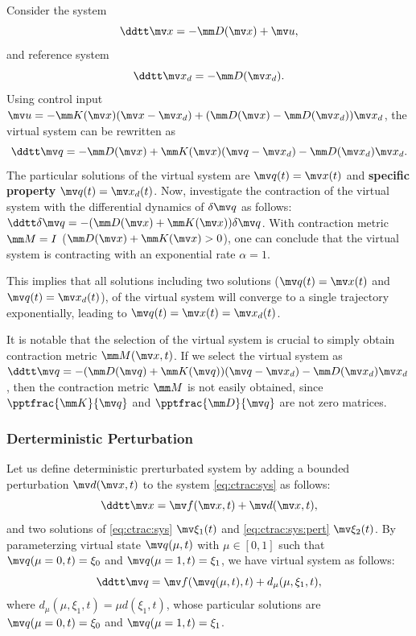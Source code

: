 \begin{example}
    Consider the system 
    \begin{equation}
        \ddtt \bdx = -\mm D(\bdx) + \bdu,
    \end{equation}
    and reference system 
    \begin{equation}
        \ddtt \bdx_d = -\mm D(\bdx_d).
    \end{equation}
    Using control input $\bdu = -\mm K(\bdx)(\bdx-\bdx_d)+(\mm D(\bdx)-\mm D(\bdx_d))\bdx_d$, the virtual system can be rewritten as
    \begin{equation}
        \ddtt\bdq=-\mm D(\bdx)+\mm K(\bdx)(\bdq-\bdx_d)-\mm D(\bdx_d)\bdx_d
        .
    \end{equation}
    The particular solutions of the virtual system are $\bdq(t)=\bdx(t)$ and \textbf{specific property} $\bdq(t)=\bdx_d(t)$.
    Now, investigate the contraction of the virtual system with the differential dynamics of $\delta\bdq$ as follows: $\ddtt\delta\bdq=-(\mm D(\bdx)+\mm K(\bdx))\delta\bdq$.
    With contraction metric $\mm M=I$ (\ie $\mm D(\bdx)+\mm K(\bdx)>0$), one can conclude that the virtual system is contracting with an exponential rate $\alpha=1$.

    This implies that all solutions including two solutions (\ie $\bdq(t)=\bdx(t)$ and $\bdq(t)=\bdx_d(t)$), of the virtual system will converge to a single trajectory exponentially, leading to $\bdq(t)=\bdx(t)=\bdx_d(t)$.
    
    It is notable that the selection of the virtual system is crucial to simply obtain contraction metric $\mm M(\bdx,t)$.
    If we select the virtual system as $\ddtt \bdq = -(\mm D(\bdq)+\mm K(\bdq))(\bdq-\bdx_d)-\mm D(\bdx_d)\bdx_d$, then the contraction metric $\mm M$ is not easily obtained, since $\pptfrac{\mm K}{\bdq}$ and $\pptfrac{\mm D}{\bdq}$ are not zero matrices.
\end{example}
    
\subsubsection{Derterministic Perturbation}

Let us define deterministic prerturbated system by adding a bounded perturbation $\bdd(\bdx,t)$ to the system \eqref{eq:ctrac:sys} as follows:
\begin{equation}
    \ddtt\bdx
    =
    \bdf(\bdx,t)
    +
    \bdd(\bdx,t)
    ,
    \label{eq:ctrac:sys:pert}
\end{equation}
and two solutions of \eqref{eq:ctrac:sys} $\mv\xi_1(t)$ and \eqref{eq:ctrac:sys:pert} $\mv\xi_2(t)$.
By parameterzing virtual state $\bdq(\mu,t)$ with $\mu\in[0,1]$ such that $\bdq(\mu=0,t)=\xi_0$ and $\bdq(\mu=1,t)=\xi_1$, we have virtual system as follows:
\begin{equation}
    \ddtt\bdq = \bdf(\bdq(\mu,t),t)+d_\mu(\mu,\xi_1,t)
    ,
    \label{eq:ctrac:sys:pert:virtual}
\end{equation}
where $d_\mu(\mu,\xi_1,t)=\mu d(\xi_1,t)$, whose particular solutions are $\bdq(\mu=0,t)=\xi_0$ and $\bdq(\mu=1,t)=\xi_1$.

